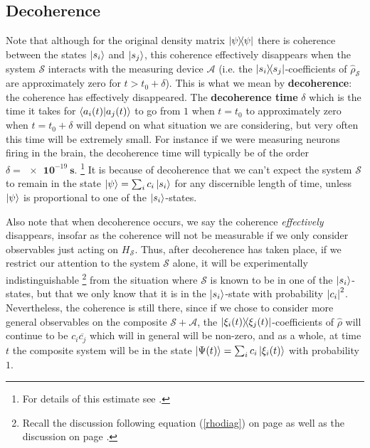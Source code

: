 \documentclass[letter, 12pt]{turabian-thesis}
\newcommand{\du}[2]{\mathbf{\SI[inter-unit-product={}\cdot{}]{#1}{#2}}}
\theoremstyle{hypothesis}
\let\origfootnote\footnote %
\renewcommand{\footnote}[1]{%
\noindent %
\origfootnote{#1}}
\begin{document}
\subsection{Decoherence}
Note that although for the original density matrix $\dyad{\psi}$ there is coherence between the states $\ket{s_i}$ and $\ket{s_j}$, this coherence effectively  disappears when the system $\mathcal{S}$ interacts with the measuring device $\mathcal{A}$ (i.e. the $\dyad{s_i}{s_j}$-coefficients of $\hat{\rho}_\mathcal{S}$ are approximately zero for $t> t_0+\delta$). This is what we mean by \textbf{decoherence}: the coherence has effectively disappeared. The \textbf{decoherence time} $\delta$ which is the time it takes for $\ip{a_i(t)}{a_j(t)}$ to go from $1$ when $t=t_0$ to approximately zero when $t=t_0+\delta$ will depend on what situation we are considering, but very often this time will be extremely small. For instance if we were measuring neurons firing in the brain, the decoherence time will typically be of the order $\delta =\du{e-19}{s}$.\footnote{For details of this estimate see \cite[370]{Schlosshauer}.} It is because of decoherence that we can't expect the system $\mathcal{S}$ to remain in the state $\ket{\psi}=\sum_i c_i\ket{s_i}$ for any discernible length of time, unless $\ket{\psi}$ is proportional to one of the $\ket{s_i}$-states.  

Also note that when decoherence occurs, we say the coherence \emph{effectively} disappears, insofar as the coherence will not be measurable if we only consider observables just acting on $H_\mathcal{S}$. Thus, after decoherence has taken place, if we restrict our attention to the system $\mathcal{S}$ alone, it will be experimentally indistinguishable\footnote{Recall the discussion following equation (\ref{rhodiag}) on page \pageref{rhodiag} as well as the discussion on page \pageref{subtle}.} from the situation where $\mathcal{S}$ is known to be in one of the $\ket{s_i}$-states, but that we only know that it is in the $\ket{s_i}$-state with probability $\abs{c_i}^2$. Nevertheless, the coherence is still there, since if we chose to consider more general observables on the composite $\mathcal{S}+\mathcal{A}$, the $\dyad{\xi_i(t)}{\xi_j(t)}$-coefficients of $\hat{\rho}$ will continue to be $c_i\overline{c_j}$ which will in general will be non-zero, and as a whole, at time $t$ the composite system will be in the state $\ket{\Psi(t)}=\sum_i c_i\ket{\xi_i(t)}$ with probability $1$.
\end{document}
